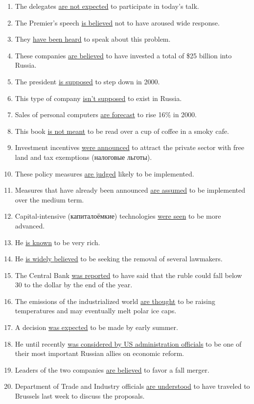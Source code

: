 \documentclass[main.tex]{subfiles}
\begin{document}
\begin{enumerate}[nosep,leftmargin=*]
	\itemsep\eitsp
	\item The delegates \uline{are not expected} to participate in today's talk.
	\item The Premier's speech \uline{is believed} not to have aroused wide response.
	\item They \uline{have been heard} to speak about this problem.
	\item These companies \uline{are believed} to have invested a total of \$25 billion into Russia.
	\item The president \uline{is supposed} to step down in 2000.
	\item This type of company \uline{isn't supposed} to exist in Russia.
	\item Sales of personal computers \uline{are forecast} to rise 16\% in 2000.
	\item This book \uline{is not meant} to be read over a cup of coffee in a smoky cafe.
	\item Investment incentives \uline{were announced} to attract the private sector with free land and tax exemptions (налоговые льготы).
	\item These policy measures \uline{are judged} likely to be implemented.
	\item Measures that have already been announced \uline{are assumed} to be implemented over the medium term.
	\item Capital-intensive (капиталоёмкие) technologies \uline{were seen} to be more advanced.
	\item He \uline{is known} to be very rich.
	\item He \uline{is widely believed} to be seeking the removal of several lawmakers.
	\item The Central Bank \uline{was reported} to have said that the ruble could fall below 30 to the dollar by the end of the year.
	\item The emissions of the industrialized world \uline{are thought} to be raising temperatures and may eventually melt polar ice caps.
	\item A decision \uline{was expected} to be made by early summer.
	\item He until recently \uline{was considered by US administration officials} to be one of their most important Russian allies on economic reform.
	\item Leaders of the two companies \uline{are believed} to favor a fall merger.
	\item Department of Trade and Industry officials \uline{are understood} to have traveled to Brussels last week to discuss the proposals.

\end{enumerate}
\end{document}
